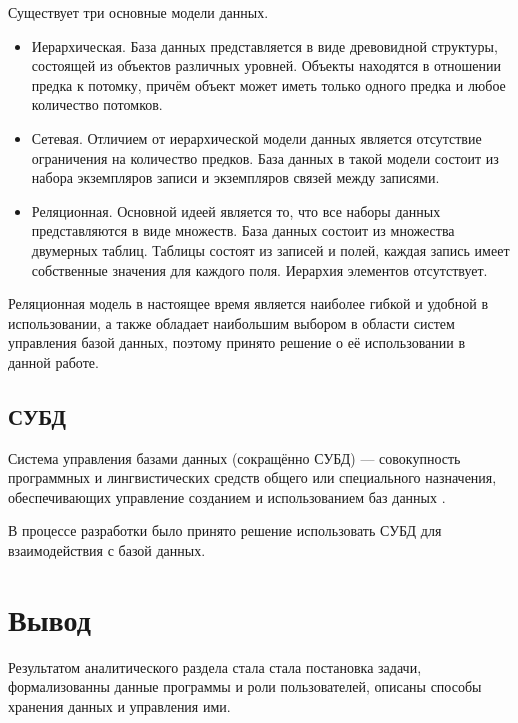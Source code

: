 Существует три основные модели данных.
\begin{itemize}
	\item Иерархическая. База данных представляется в виде древовидной структуры, состоящей из объектов различных уровней. Объекты находятся в отношении предка к потомку, причём объект может иметь только одного предка и любое количество потомков.
	\item Сетевая. Отличием от иерархической модели данных является отсутствие ограничения на количество предков. База данных в такой модели состоит из набора экземпляров записи и экземпляров связей между записями.
	\item Реляционная. Основной идеей является то, что все наборы данных представляются в виде множеств. База данных состоит из множества двумерных таблиц. Таблицы состоят из записей и полей, каждая запись имеет собственные значения для каждого поля. Иерархия элементов отсутствует. 
\end{itemize}

Реляционная модель в настоящее время является наиболее гибкой и удобной в использовании, а также обладает наибольшим выбором в области систем управления базой данных, поэтому принято решение о её использовании в данной работе.


\subsection{СУБД}
Система управления базами данных (сокращённо СУБД) — совокупность
программных и лингвистических средств общего или специального назначения,
обеспечивающих управление созданием и использованием баз данных \cite{db_model}.

В процессе разработки было принято решение использовать СУБД для взаимодействия с базой данных.


\section*{Вывод}
Результатом аналитического раздела стала стала постановка задачи, формализованны данные программы и роли пользователей, описаны способы хранения данных и управления ими.